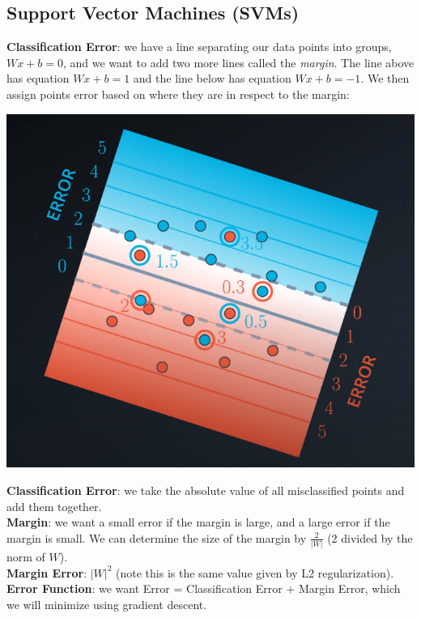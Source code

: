 \documentclass[11pt, a4paper]{article}
\begin{document}
\begin{spacing}{1.1}
	\subsection{Support Vector Machines (SVMs)}
	\textbf{Classification Error}: we have a line separating our data points into groups, $Wx+b = 0$, and we want to add two more lines called the \textit{margin}. The line above has equation $Wx+b = 1$ and the line below has equation $Wx+b = -1$. We then assign points error based on where they are in respect to the margin:
	\begin{center}
	\includegraphics[scale=.3]{SVM}
	\end{center}
	\textbf{Classification Error}: we take the absolute value of all misclassified points and add them together. \vspace*{2mm}\\
	\textbf{Margin}: we want a small error if the margin is large, and a large error if the margin is small. We can determine the size of the margin by $\frac{2}{|W|}$ (2 divided by the norm of $W$). \vspace*{2mm}\\
	\textbf{Margin Error}: $|W|^2$ (note this is the same value given by L2 regularization). \vspace*{2mm}\\
	\textbf{Error Function}: we want Error = Classification Error + Margin Error, which we will minimize using gradient descent. \vspace*{2mm}\\

\end{spacing}
\end{document}
